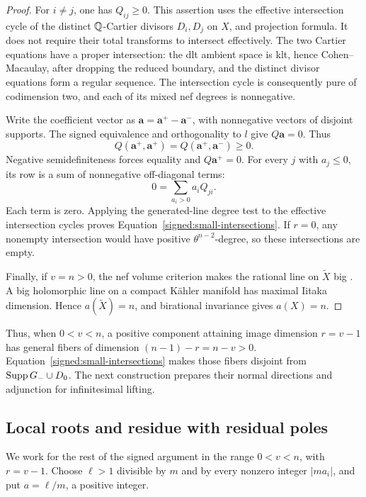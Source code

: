 \begin{proof}
For \(i\ne j\), one has \(Q_{ij}\geq0\).  This assertion uses
the effective intersection cycle of the distinct \(\mathbb Q\)-Cartier
divisors \(D_i,D_j\) on \(X\), and projection formula.  It does
not require their total transforms to intersect effectively.  The
two Cartier equations have a proper intersection: the dlt ambient
space is klt, hence Cohen--Macaulay, after dropping the reduced
boundary, and the distinct divisor equations form a regular
sequence.  The intersection cycle is consequently pure of
codimension two, and each of its mixed nef degrees is nonnegative.

Write the coefficient vector as
\(\mathbf a=\mathbf a^+-\mathbf a^-\), with nonnegative vectors
of disjoint supports.  The signed equivalence and orthogonality to
\(l\) give \(Q\mathbf a=0\).  Thus
\[
 Q(\mathbf a^+,\mathbf a^+)
   =Q(\mathbf a^+,\mathbf a^-)\geq0.
\]
Negative semidefiniteness forces equality and
\(Q\mathbf a^+=0\).  For every \(j\) with \(a_j\leq0\), its
row is a sum of nonnegative off-diagonal terms:
\[
 0=\sum_{a_i>0}a_iQ_{ji}.
\]
Each term is zero.  Applying the generated-line degree test to the
effective intersection cycles proves
Equation~\eqref{signed:small-intersections}.  If \(r=0\), any
nonempty intersection would have positive \(\theta^{n-2}\)-degree,
so these intersections are empty.

Finally, if \(v=n>0\), the nef volume criterion makes the rational
line on \(\widetilde X\) big
\cite[Theorem~0.5]{DemaillyPaun2004}.  A big holomorphic line on a
compact Kähler manifold has maximal Iitaka dimension.  Hence
\(a(\widetilde X)=n\), and birational invariance gives \(a(X)=n\).
\end{proof}

Thus, when \(0<v<n\), a positive component attaining image dimension
\(r=v-1\) has general fibers of dimension \((n-1)-r=n-v>0\).
Equation~\eqref{signed:small-intersections} makes those fibers disjoint
from \(\operatorname{Supp} G_-\cup D_0\).  The next construction prepares their normal
directions and adjunction for infinitesimal lifting.

\subsection{Local roots and residue with residual poles}

We work for the rest of the signed argument in the range
\(0<v<n\), with \(r=v-1\).  Choose \(\ell>1\) divisible by \(m\)
and by every nonzero integer \(|ma_i|\), and put
\(a=\ell/m\), a positive integer.

